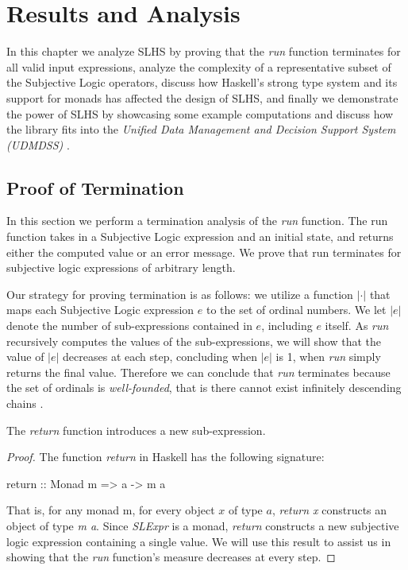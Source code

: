 \documentclass[thesis.tex]{subfiles}
\begin{document}
\chapter{Results and Analysis}
\label{chap:results-and-analysis}

In this chapter we analyze SLHS by proving that the \emph{run} function terminates for
all valid input expressions, analyze the complexity of a representative subset of the Subjective Logic operators,
discuss how Haskell's strong type system and its support for monads has affected the
design of SLHS, and finally we demonstrate the power of SLHS by showcasing some
example computations and discuss how the library fits into the
\emph{Unified Data Management and Decision Support System (UDMDSS)} \cite{kent2010application, kent2010towards}.


\section{Proof of Termination}
\label{sec:termination}

In this section we perform a termination analysis of the \emph{run} function. The
run function takes in a Subjective Logic expression and an initial state, and returns
either the computed value or an error message. We prove that run terminates for
subjective logic expressions of arbitrary length.

Our strategy for proving termination is as follows: we utilize a function $|\cdot|$ that
maps each Subjective Logic expression $e$ to the set of ordinal numbers. We let $|e|$
denote the number of sub-expressions contained in
$e$, including $e$ itself. As \emph{run} recursively computes the values of the
sub-expressions, we will show that the value of $|e|$ decreases at each step, concluding
when $|e|$ is 1, when \emph{run} simply returns the final value. Therefore we can conclude
that \emph{run} terminates because the set of ordinals is \emph{well-founded}, that is there
cannot exist infinitely descending chains \cite{moschovakis2006notes}.

\begin{lemma}
  The \emph{return} function introduces a new sub-expression.
\end{lemma}

\begin{proof}
  The function \emph{return} in Haskell has the following signature:

  \begin{spec}
    return :: Monad m => a -> m a
  \end{spec}

  That is, for any monad m, for every object $x$ of type $a$, \emph{return x} constructs
  an object of type \emph{m a}. Since \emph{SLExpr} is a monad, \emph{return} constructs
  a new subjective logic expression containing a single value. We will use this result to
  assist us in showing that the \emph{run} function's measure decreases at every step.
\end{proof}
\end{document}
